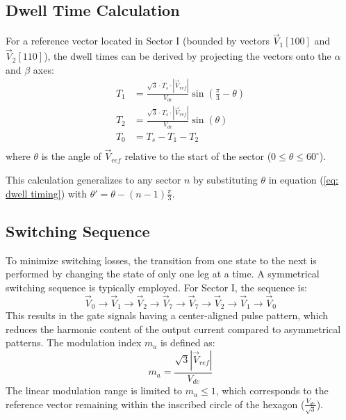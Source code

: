 \subsection{Dwell Time Calculation}
For a reference vector located in Sector I (bounded by vectors $\vec{V}_1 [100]$ and $\vec{V}_2 [110]$),
the dwell times can be derived by projecting the vectors onto the $\alpha$ and $\beta$ axes:
\begin{equation}
    \begin{split}
        T_1 &= \frac{\sqrt{3} \cdot T_s \cdot |\vec{V}_{ref}|}{V_{dc}} \sin\left(\frac{\pi}{3} - \theta\right)\\
        T_2 &= \frac{\sqrt{3} \cdot T_s \cdot |\vec{V}_{ref}|}{V_{dc}} \sin(\theta)\\
        T_0 &= T_s - T_1 - T_2\\
    \end{split}
    \label{eq: dwell timing}
\end{equation}
where $\theta$ is the angle of $\vec{V}_{ref}$ relative to the start of the sector ($0 \le \theta \le 60^\circ$).\par
This calculation generalizes to any sector $n$ by substituting $\theta$ in equation (\ref{eq: dwell timing}) 
with $\theta' = \theta - (n-1)\frac{\pi}{3}$.\par
\subsection{Switching Sequence}
To minimize switching losses, the transition from one state to the next is performed by changing the state of only one leg at a time.
A symmetrical switching sequence is typically employed. For Sector I, the sequence is:
\begin{equation}
    \vec{V}_0 \rightarrow \vec{V}_1 \rightarrow \vec{V}_2 \rightarrow \vec{V}_7 \rightarrow \vec{V}_7 \rightarrow \vec{V}_2 \rightarrow \vec{V}_1 \rightarrow \vec{V}_0
\end{equation}
This results in the gate signals having a center-aligned pulse pattern, which reduces the harmonic content of the
output current compared to asymmetrical patterns. The modulation index $m_a$ is defined as:
\begin{equation}
    m_a = \frac{\sqrt{3} |\vec{V}_{ref}|}{V_{dc}}
\end{equation}
The linear modulation range is limited to $m_a \le 1$, which corresponds to the reference vector remaining within
the inscribed circle of the hexagon ($\frac{V_{dc}}{\sqrt{3}}$).